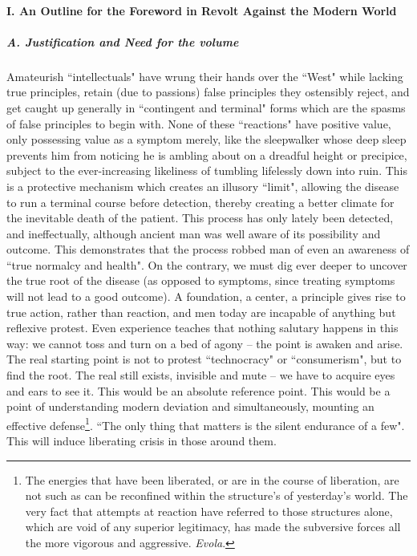 \paragraph{I. An Outline for the Foreword in Revolt Against the Modern World}
\subparagraph{A. Justification and Need for the volume}
Amateurish ``intellectuals" have wrung their hands over the ``West" while lacking true principles, retain (due to passions) false principles they ostensibly reject, and get caught up generally in ``contingent and terminal" forms which are the spasms of false principles to begin with. None of these ``reactions" have positive value, only possessing value as a symptom merely, like the sleepwalker whose deep sleep prevents him from noticing he is ambling about on a dreadful height or precipice, subject to the ever-increasing likeliness of tumbling lifelessly down into ruin. This is a protective mechanism which creates an illusory ``limit", allowing the disease to run a terminal course before detection, thereby creating a better climate for the inevitable death of the patient. This process has only lately been detected, and ineffectually, although ancient man was well aware of its possibility and outcome. This demonstrates that the process robbed man of even an awareness of ``true normalcy and health". On the contrary, we must dig ever deeper to uncover the true root of the disease (as opposed to symptoms, since treating symptoms will not lead to a good outcome). A foundation, a center, a principle gives rise to true action, rather than reaction, and men today are incapable of anything but reflexive protest. Even experience teaches that nothing salutary happens in this way: we cannot toss and turn on a bed of agony – the point is awaken and arise. The real starting point is not to protest ``technocracy" or ``consumerism", but to find the root. The real still exists, invisible and mute – we have to acquire eyes and ears to see it. This would be an absolute reference point. This would be a point of understanding modern deviation and simultaneously, mounting an effective defense\footnote{The energies that have been liberated, or are in the course of liberation, are not such as can be reconfined within the structure's of yesterday's world. The very fact that attempts at reaction have referred to those structures alone, which are void of any superior legitimacy, has made the subversive forces all the more vigorous and aggressive. \textit{Evola}.}. ``The only thing that matters is the silent endurance of a few". This will induce liberating crisis in those around them.

